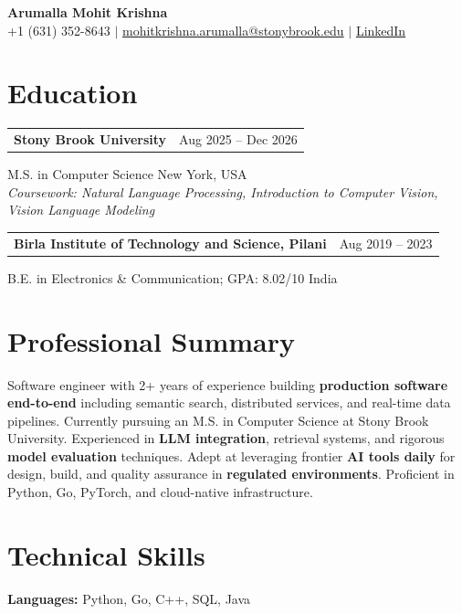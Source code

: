 \documentclass[letterpaper,10pt]{article}
\makeatletter
\newcommand{\entry}[2]{%
  \noindent
  \begin{tabularx}{\linewidth}
    {@{}>{\raggedright\arraybackslash}X@{\hspace{6pt}}r@{}}
    \textbf{#1} & #2
  \end{tabularx}\par
}
\makeatother
\begin{document}
\begin{center}
    {\LARGE\bfseries Arumalla Mohit Krishna}\\[3pt]
    +1 (631) 352-8643 $|$
    \href{mailto:mohitkrishna.arumalla@stonybrook.edu}
    {mohitkrishna.arumalla@stonybrook.edu} $|$
    \href{https://linkedin.com/in/mohit-krishna-arumalla}
    {LinkedIn}
\end{center}
\vspace{-8pt}

\section{Education}

\entry
  {\textbf{Stony Brook University}}
  {Aug 2025 -- Dec 2026}

M.S. in Computer Science \hfill New York, USA\\
\textit{
Coursework: Natural Language Processing,
Introduction to Computer Vision, Vision Language Modeling
}
\vspace{3pt}

\entry
  {\textbf{Birla Institute of Technology and Science, Pilani}}
  {Aug 2019 -- 2023}

B.E. in Electronics \& Communication; GPA: 8.02/10 \hfill India
\section{Professional Summary}

Software engineer with 2+ years of experience building \textbf{production software end-to-end} including semantic search, distributed services, and real-time data pipelines. Currently pursuing an M.S. in Computer Science at Stony Brook University. Experienced in \textbf{LLM integration}, retrieval systems, and rigorous \textbf{model evaluation} techniques. Adept at leveraging frontier \textbf{AI tools daily} for design, build, and quality assurance in \textbf{regulated environments}. Proficient in Python, Go, PyTorch, and cloud-native infrastructure.
\section{Technical Skills}

\textbf{Languages:}
Python, Go, C++, SQL, Java\\
\end{document}
